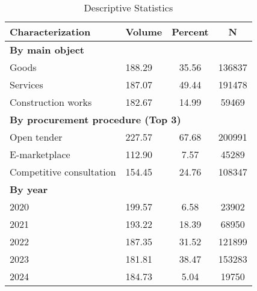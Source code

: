 \begin{table}[htbp]\centering
\caption{Descriptive Statistics}
\renewcommand{\arraystretch}{0.9}
\begin{tabular}{p{5cm}p{3cm}cc}
\hline\hline
Characterization & Volume & Percent & N \\
\midrule
\textbf{By main object} \\
Goods &    188.29 &     35.56 & 136837 \\[-3pt]
Services &    187.07 &     49.44 & 191478 \\[-3pt]
Construction works &    182.67 &     14.99 & 59469 \\
\midrule
\multicolumn{4}{l}{\textbf{By procurement procedure (Top 3)}} \\
Open tender &    227.57 &     67.68 & 200991 \\[-3pt]
E-marketplace &    112.90 &      7.57 & 45289 \\[-3pt]
Competitive consultation &    154.45 &     24.76 & 108347 \\
\midrule
\textbf{By year} \\
2020 &    199.57 &      6.58 & 23902 \\[-3pt]
2021 &    193.22 &     18.39 & 68950 \\[-3pt]
2022 &    187.35 &     31.52 & 121899 \\[-3pt]
2023 &    181.81 &     38.47 & 153283 \\[-3pt]
2024 &    184.73 &      5.04 & 19750 \\[-3pt]
\hline\hline
\end{tabular}
\end{table}
